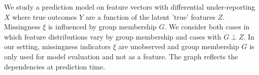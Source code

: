 \documentclass{article}
\begin{document}

\bigskip

We study a prediction model on feature vectors with differential under-reporting \( X \) where true outcomes \( Y \) are a function of the latent 'true' features \( Z \). Missingness \( \xi \) is influenced by group membership \( G \). We consider both cases in which feature distributions vary by group membership and cases with \( G \perp Z \). In our setting, missingness indicators \( \xi \) are unobserved and group membership \( G \) is only used for model evaluation and not as a feature. The graph reflects the dependencies at prediction time.
\end{document}
